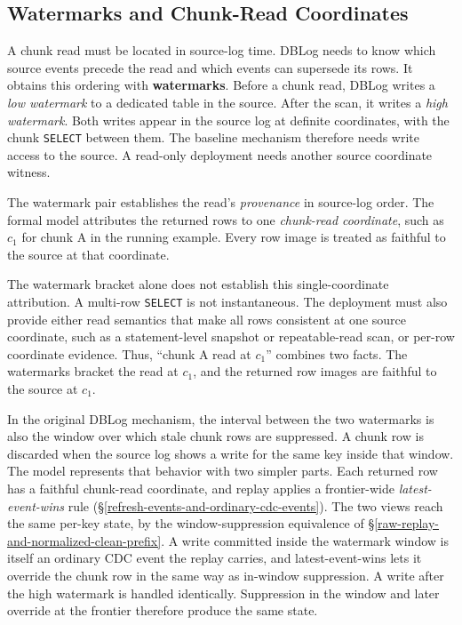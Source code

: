 \documentclass[letterpaper,10pt,twocolumn]{article}
\begin{document}
\subsection{Watermarks and Chunk-Read
Coordinates}\label{watermarks-and-chunk-read-coordinates}

A chunk read must be located in source-log time. DBLog needs to know
which source events precede the read and which events can supersede its
rows. It obtains this ordering with \textbf{watermarks}. Before a chunk
read, DBLog writes a \emph{low watermark} to a dedicated table in the
source. After the scan, it writes a \emph{high watermark}. Both writes
appear in the source log at definite coordinates, with the chunk
\texttt{SELECT} between them. The baseline mechanism therefore needs
write access to the source. A read-only deployment needs another source
coordinate witness.

The watermark pair establishes the read's \emph{provenance} in
source-log order. The formal model attributes the returned rows to one
\emph{chunk-read coordinate}, such as $c_1$ for chunk A in the running
example. Every row image is treated as faithful to the source at that
coordinate.

The watermark bracket alone does not establish this single-coordinate
attribution. A multi-row \texttt{SELECT} is not instantaneous. The
deployment must also provide either read semantics that make all rows
consistent at one source coordinate, such as a statement-level snapshot
or repeatable-read scan, or per-row coordinate evidence. Thus, ``chunk A
read at $c_1$'' combines two facts. The watermarks bracket the read at
$c_1$, and the returned row images are faithful to the source at
$c_1$.

In the original DBLog mechanism, the interval between the two
watermarks is also the window over which stale chunk rows are
suppressed. A chunk row is
discarded when the source log shows a write for the same key inside that
window. The model represents that behavior with two simpler parts. Each
returned row has a faithful chunk-read coordinate, and replay applies a
frontier-wide \emph{latest-event-wins} rule
(\S\ref{refresh-events-and-ordinary-cdc-events}). The two views reach the
same per-key state, by the window-suppression equivalence of
\S\ref{raw-replay-and-normalized-clean-prefix}. A write committed inside
the watermark window is
itself an ordinary CDC event the replay carries, and latest-event-wins
lets it override the chunk row in the same way as in-window suppression.
A write after the high watermark is handled identically. Suppression in
the window and later override at the frontier therefore produce the
same state.
\end{document}
